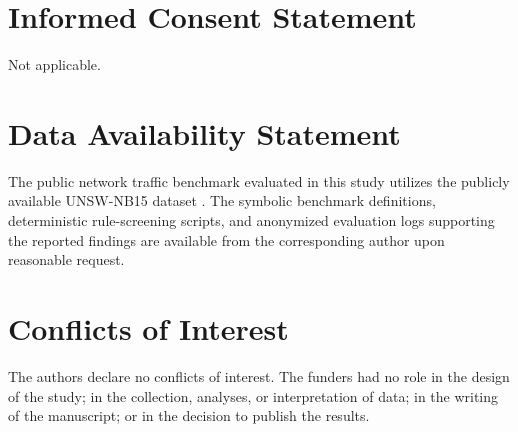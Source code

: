 \documentclass[journal]{IEEEtran}
\theoremstyle{definition}
\theoremstyle{remark}
\begin{document}
\section*{Informed Consent Statement}
Not applicable.

\section*{Data Availability Statement}
The public network traffic benchmark evaluated in this study utilizes the publicly available UNSW-NB15 dataset \cite{moustafa2015unsw}. The symbolic benchmark definitions, deterministic rule-screening scripts, and anonymized evaluation logs supporting the reported findings are available from the corresponding author upon reasonable request.

\section*{Conflicts of Interest}
The authors declare no conflicts of interest. The funders had no role in the design of the study; in the collection, analyses, or interpretation of data; in the writing of the manuscript; or in the decision to publish the results.



\end{document}

